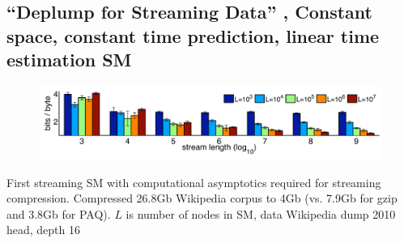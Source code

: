 \documentclass[16pt]{beamer}
\begin{document}
\begin{frame}[t]{}
\begin{frame}[t]{}
\end{frame}

\subsection{``Deplump for Streaming Data'' \citet{Bartlett2010}, Constant space, constant time prediction, linear time estimation SM}
\begin{frame}[t]{}
\begin{figure}[htbp]
\begin{center}
\includegraphics[width=\textwidth]{varying_stream_length.pdf}
\end{center}
\end{figure}
First streaming SM with computational asymptotics required for streaming compression.  Compressed 26.8Gb Wikipedia corpus to 4Gb (vs. 7.9Gb for gzip and 3.8Gb for PAQ).\newline
\vspace{3cm}
{\tiny $L$ is number of nodes in SM, data Wikipedia dump 2010 head, depth 16}
\end{frame}






\end{frame}
\end{document}
